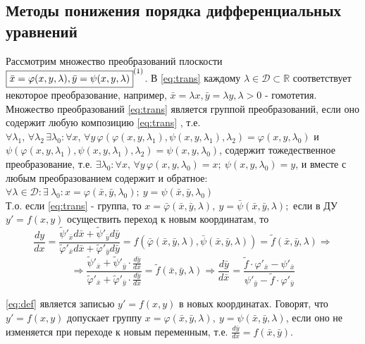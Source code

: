 \subsection{Методы понижения порядка дифференциальных уравнений}
\begin{proposition}

	Рассмотрим множество преобразований плоскости \\ $ \boxed{\bar{x} = \varphi(x,y,\lambda), \bar{y} = \psi (x,y,\lambda)}^{\eqnum\label{eq:trans}} $. В \eqref{eq:trans} каждому $ \lambda \in \mathcal{ D }  \subset \mathbb{ R } $ соответствует некоторое преобразование, например, $ \bar{x} = \lambda x, \bar{y} = \lambda y, \lambda > 0 $ - гомотетия. Множество преобразований \eqref{eq:trans}  является группой преобразований, если оно содержит любую композицию \eqref{eq:trans} , т.е. 
	$ \forall \lambda_1,\, \forall \lambda_2 \, \exists \lambda_0 : \forall x, \, \forall y \, \varphi(\varphi(x,y,\lambda_1), \psi(x,y,\lambda_1), \lambda_2) = \varphi(x,y,\lambda_0) $ и $\psi(\varphi(x,y,\lambda_1), \psi(x,y,\lambda_1), \lambda_2) = \psi(x,y,\lambda_0) $, содержит тожедественное преобразование, т.е. $ \exists \lambda_0: \forall x, \, \forall y \, \varphi(x,y,\lambda_0) = x; \ \psi(x,y,\lambda_0) = y $, и вместе с любым преобразованием содержит и обратное: $ \forall \lambda \in \mathcal{D} \colon  \exists \ \lambda_0 \colon x =  \varphi  (\bar{x}, \bar{y}, \lambda_0); \ y = \psi (\bar{x}, \bar{y}, \lambda_0) $ \\
	Т.о. если \eqref{eq:trans} - группа, то $ x = \bar{\varphi} (\bar{x}, \bar{y}, \lambda), \ y =  \bar{\psi}  (\bar{x}, \bar{y}, \lambda);$ если в ДУ $ y' = f(x,y)$ осуществить переход к новым координатам, то \\
	$$
	\frac{dy}{dx} = \frac{ \widetilde{\psi}'_{ \bar{x} } d\bar{x} +  \widetilde{\psi}'_{ \bar{y} } d\bar{y} }{ \widetilde{\varphi}'_{\bar{x}} d\bar{x} + \widetilde{\varphi}'_{\bar{y}} d\bar{y}} = f(\bar{ \varphi }(\bar{x}, \bar{y}, \lambda), \bar{ \psi }(\bar{x}, \bar{y}, \lambda)) = \tilde{f}(\bar{x}, \bar{y}, \lambda) \Rightarrow
	$$	
	\begin{equation} \label{eq:def}
	\Rightarrow \frac{ \widetilde{\psi}'_{ \bar{x} } + \widetilde{\psi}'_{ \bar{y} } \cdot \frac{d\bar{y}}{d\bar{x}} }{ \widetilde{\varphi}'_{\bar{x}} + \widetilde{\varphi}'_{\bar{y}} \cdot \frac{d\bar{y}}{d\bar{x}} } = \tilde{f}(\bar{x}, \bar{y}, \lambda) \Rightarrow \frac{d\bar{y}}{d\bar{x}} = \frac{\tilde{f} \cdot \varphi'_{\bar{x}} - \psi'_{\bar{x} }}{\psi'_{\bar{y}} - \tilde{f} \cdot \varphi'_{\bar{y}}}
	\end{equation}  
	
	\eqref{eq:def} является записью $ y' = f(x,y) $ в новых координатах. Говорят, что $ y' = f(x,y) $ допускает группу $ x = \varphi (\bar{x}, \bar{y}, \lambda), \ y =  \psi (\bar{x}, \bar{y}, \lambda)$, если оно не изменяется при переходе к новым переменным, т.е. $ \frac{d\bar{y}}{d\bar{x}} = f(\bar{x}, \bar{y}) $.
\end{proposition}

